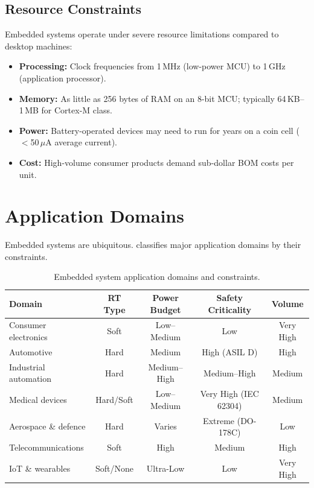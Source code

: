 \subsection{Resource Constraints}

Embedded systems operate under severe resource limitations compared to desktop machines:
\begin{itemize}
  \item \textbf{Processing:} Clock frequencies from 1\,MHz (low-power MCU) to 1\,GHz (application processor).
  \item \textbf{Memory:} As little as 256 bytes of RAM on an 8-bit MCU; typically 64\,KB--1\,MB for Cortex-M class.
  \item \textbf{Power:} Battery-operated devices may need to run for years on a coin cell ($<$50\,$\mu$A average current).
  \item \textbf{Cost:} High-volume consumer products demand sub-dollar BOM costs per unit.
\end{itemize}

\section{Application Domains}
\label{sec:intro:domains}

Embedded systems are ubiquitous.  classifies major application domains by their constraints.

\begin{table}[H]
\centering
\caption{Embedded system application domains and constraints.}
\label{tab:intro:domains}
\begin{tabularx}{\textwidth}{l c c c c}
\toprule
\textbf{Domain} & \textbf{RT Type} & \textbf{Power Budget} & \textbf{Safety Criticality} & \textbf{Volume} \\
\midrule
Consumer electronics & Soft & Low--Medium & Low & Very High \\
Automotive & Hard & Medium & High (ASIL D) & High \\
Industrial automation & Hard & Medium--High & Medium--High & Medium \\
Medical devices & Hard/Soft & Low--Medium & Very High (IEC 62304) & Medium \\
Aerospace \& defence & Hard & Varies & Extreme (DO-178C) & Low \\
Telecommunications & Soft & High & Medium & High \\
IoT \& wearables & Soft/None & Ultra-Low & Low & Very High \\
\bottomrule
\end{tabularx}
\end{table}

